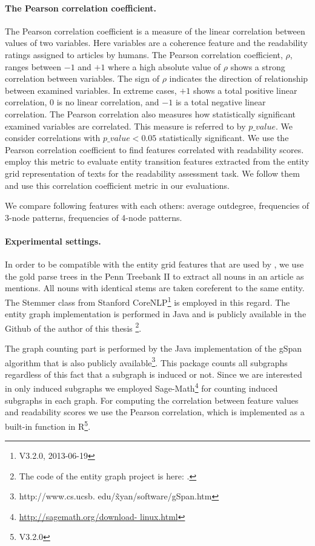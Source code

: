 \paragraph{The Pearson correlation coefficient.} 
The Pearson correlation coefficient is a measure of the linear correlation between values of two variables. 
Here variables are a coherence feature and the readability ratings assigned to articles by humans. 
The Pearson correlation coefficient, $\rho$, ranges between $-1$ and $+1$ where a high absolute value of $\rho$ shows a strong correlation between variables. 
The sign of $\rho$ indicates the direction of relationship between examined variables. 
In extreme cases, $+1$ shows a total positive linear correlation, $0$ is no linear correlation, and $-1$ is a total negative linear correlation. 
The Pearson correlation also measures how statistically significant examined variables are correlated. 
This measure is referred to by $p\_value$. 
We consider correlations with $p\_value < 0.05$ statistically significant. 
We use the Pearson correlation coefficient to find features correlated with readability scores. 
 employ this metric to evaluate entity transition features extracted from the entity grid representation \cite{barzilay08} of texts for the readability assessment task. 
We follow them and use this correlation coefficient metric in our evaluations. 


We compare following features with each others: average outdegree, frequencies of 3-node patterns, frequencies of 4-node patterns. 

\paragraph{Experimental settings.} 
In order to be compatible with the entity grid features that are used by , we use the gold parse trees in the Penn Treebank II \cite{marcus94} to extract all nouns in an article as mentions. 
All nouns with identical stems are taken coreferent to the same entity. 
The Stemmer class from Stanford CoreNLP\footnote{V3.2.0, 2013-06-19} is employed in this regard.  
The entity graph implementation is performed in Java and is publicly available in the Github of the author of this thesis
\footnote{The code of the entity graph project is here: \url{}.}. 

The graph counting part is performed by the Java implementation of the gSpan algorithm that is also publicly available\footnote{http://www.cs.ucsb. edu/\~xyan/software/gSpan.htm}. 
This package counts all subgraphs regardless of this fact that a subgraph is induced or not. 
Since we are interested in only induced subgraphs we employed Sage-Math\footnote{\url{http://sagemath.org/download- linux.html}} for counting induced subgraphs in each graph.  
For computing the correlation between feature values and readability scores we use the Pearson correlation, which is implemented as a built-in function in R\footnote{V3.2.0}. 

